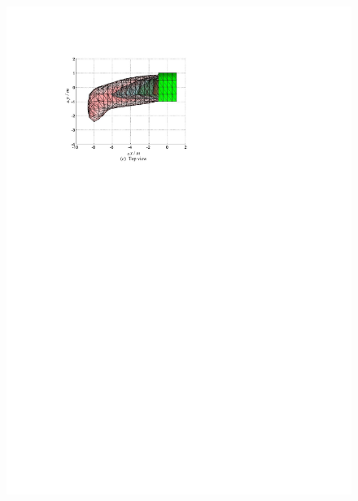 \begin{figure}[h]
\begin{minipage}{0.45\linewidth}
		\includegraphics[width=0.9\linewidth]{Figures/Figs_Ch13/Fig8_3}
	\end{minipage}\qquad
	\begin{minipage}{0.45\linewidth}
		\centering

\end{minipage}
\end{figure}
